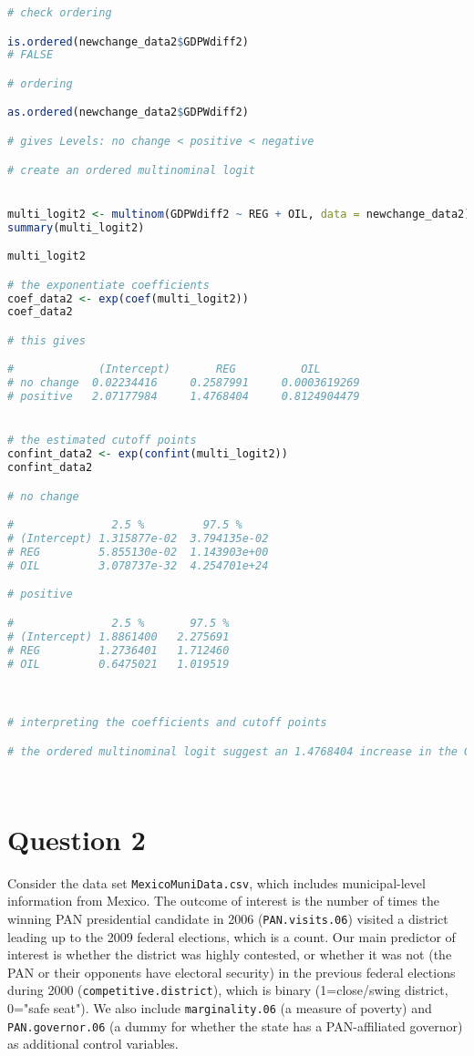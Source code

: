 \documentclass[12pt,letterpaper]{article}
\begin{document}
\begin{enumerate}
\begin{lstlisting}[language=R]
# check ordering 

is.ordered(newchange_data2$GDPWdiff2)
# FALSE

# ordering

as.ordered(newchange_data2$GDPWdiff2)

# gives Levels: no change < positive < negative

# create an ordered multinominal logit


multi_logit2 <- multinom(GDPWdiff2 ~ REG + OIL, data = newchange_data2)
summary(multi_logit2)

multi_logit2

# the exponentiate coefficients
coef_data2 <- exp(coef(multi_logit2))
coef_data2

# this gives 

#             (Intercept)       REG          OIL
# no change  0.02234416     0.2587991     0.0003619269
# positive   2.07177984     1.4768404     0.8124904479


# the estimated cutoff points 
confint_data2 <- exp(confint(multi_logit2))
confint_data2

# no change

#               2.5 %         97.5 %
# (Intercept) 1.315877e-02  3.794135e-02
# REG         5.855130e-02  1.143903e+00
# OIL         3.078737e-32  4.254701e+24

# positive

#               2.5 %       97.5 %
# (Intercept) 1.8861400   2.275691
# REG         1.2736401   1.712460
# OIL         0.6475021   1.019519



# interpreting the coefficients and cutoff points

# the ordered multinominal logit suggest an 1.4768404 increase in the GDP for Democracy 
	
	
	\end{lstlisting}
	


	
	
\end{enumerate}

\section*{Question 2} 
\vspace{.25cm}

\noindent Consider the data set \texttt{MexicoMuniData.csv}, which includes municipal-level information from Mexico. The outcome of interest is the number of times the winning PAN presidential candidate in 2006 (\texttt{PAN.visits.06}) visited a district leading up to the 2009 federal elections, which is a count. Our main predictor of interest is whether the district was highly contested, or whether it was not (the PAN or their opponents have electoral security) in the previous federal elections during 2000 (\texttt{competitive.district}), which is binary (1=close/swing district, 0="safe seat"). We also include \texttt{marginality.06} (a measure of poverty) and \texttt{PAN.governor.06} (a dummy for whether the state has a PAN-affiliated governor) as additional control variables. 
\end{document}

